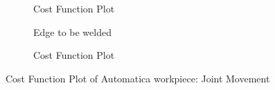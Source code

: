 \begin{figure}[!ht]
\begin{subfigure}[b]{0.4\textwidth}
		\caption{Cost Function Plot}  
		\label{fig:18b}
	\end{subfigure}	
	\begin{subfigure}[b]{0.4\textwidth}
		\caption{Edge to be welded}  
		\label{fig:18c}
	\end{subfigure}
	\begin{subfigure}[b]{0.4\textwidth}
		\caption{Cost Function Plot}  
		\label{fig:18d}
	\end{subfigure}	
	\caption{Cost Function Plot of Automatica workpiece: Joint Movement}
	\label{fig:18}
\end{figure}

